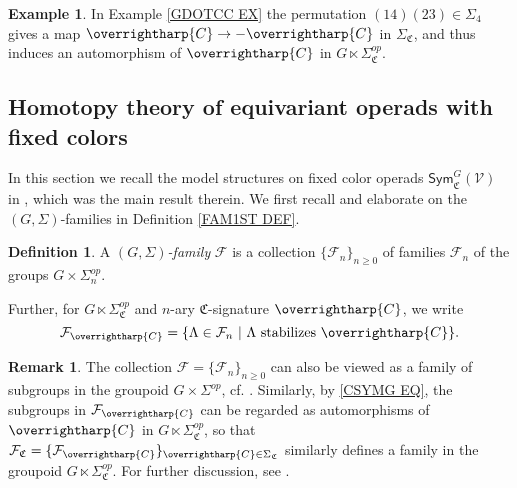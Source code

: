 \documentclass[a4paper,10pt
 ,final
]{article}%
\numberwithin{equation}{section}
\numberwithin{figure}{section}
\theoremstyle{definition} %
\newtheorem{definition}[equation]{Definition}%
\newtheorem{example}[equation]{Example}%
\newtheorem{remark}[equation]{Remark}%
\newcommand{\vect}[1]{\text{\overrightharp{\ensuremath{#1}}}}
\newcommand{\F}{\ensuremath{\mathcal F}}
\newcommand{\V}{\ensuremath{\mathcal V}}
\newcommand{\1}{\ensuremath{\mathbbm 1}}%
\begin{document}
\begin{example}
In Example \ref{GDOTCC EX}
the permutation $(14)(23) \in \Sigma_4$
gives a map $\vect{C} \to -\vect{C}$ in $\Sigma_{\mathfrak{C}}$,
and thus induces an automorphism of
$\vect{C}$ in $G \ltimes \Sigma_{\mathfrak{C}}^{op}$.
\end{example}





\subsection{Homotopy theory of equivariant operads with fixed colors}\label{COLFIXMOD SEC}

In this section we recall the model structures on fixed color operads 
$\mathsf{Sym}^G_{\mathfrak{C}}(\V)$
in 
\cite[Thm. \ref{OC-THMI}]{BP_FCOP},
which was the main result therein.
%
We first recall and elaborate on the $(G,\Sigma)$-families in Definition \ref{FAM1ST DEF}.

\begin{definition}\label{GSFAM_DEF}
	A \emph{$(G,\Sigma)$-family} $\mathcal{F}$ is 
	a collection $\{\mathcal{F}_n\}_{n \geq 0}$ of families $\F_n$ of the groups 
	$G \times \Sigma_n^{op}$.
	
	Further, for $G \ltimes \Sigma^{op}_{\mathfrak{C}}$
	and $n$-ary $\mathfrak{C}$-signature $\vect{C}$,
	we write
	\begin{equation}\label{FVECTC EQ}
                \mathcal{F}_{\vect{C}} =
                \{\Lambda \in \mathcal{F}_n \ | \ \Lambda \text{ stabilizes } \vect{C}\}.
	\end{equation}
\end{definition}

\begin{remark}
	The collection $\mathcal{F} = \{\mathcal{F}_n\}_{n \geq 0}$
	can also be viewed as a family of subgroups
	in the groupoid $G \times \Sigma^{op}$,
	cf. \cite[Def. \ref{OC-FAMGROUPOID DEF}]{BP_FCOP}.
	Similarly,
	by \eqref{CSYMG EQ},
	the subgroups in $\mathcal{F}_{\vect{C}}$
	can be regarded as automorphisms of $\vect{C}$
	in $G \ltimes \Sigma^{op}_{\mathfrak{C}}$,
	so that
	$\mathcal{F}_{\mathfrak{C}}
	=\{ \mathcal{F}_{\vect{C}}\}_{\vect{C} \in \Sigma_{\mathfrak{C}}}$
	similarly defines a family in the groupoid
	$G \ltimes \Sigma^{op}_{\mathfrak{C}}$.
	For further discussion,
	see \cite[Def. \ref{OC-GSFAM_DEF} and Rem. \ref{OC-FAMC_DEF_EQ}]{BP_FCOP}.
\end{remark}
\end{document}
